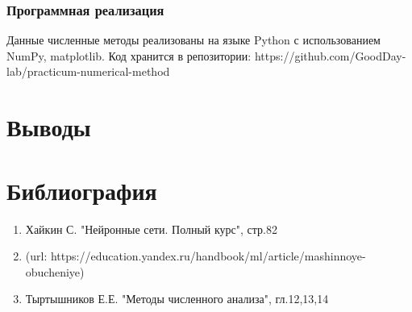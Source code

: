 \documentclass{article}
\begin{document}
\subsubsection{Программная реализация}
Данные численные методы реализованы на языке Python с использованием NumPy, matplotlib.
Код хранится в репозитории: https://github.com/GoodDay-lab/practicum-numerical-method

\section{Выводы}


\section{Библиография}
\begin{enumerate}
    \item Хайкин С. "Нейронные сети. Полный курс", стр.82
    \item (url: https://education.yandex.ru/handbook/ml/article/mashinnoye-obucheniye)
    \item Тыртышников Е.Е. "Методы численного анализа", гл.12,13,14
\end{enumerate}
\end{document}

